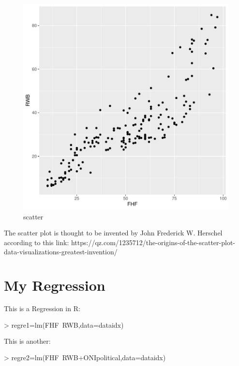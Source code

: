 \documentclass[11pt]{article}
\begin{document}
\begin{figure}[h]
\centering
\begin{adjustbox}{width=7cm,height=5.5cm}
\includegraphics{PaperInR_7-numnum_plot}
\end{adjustbox}
\caption{scatter}  
\label{numnum_plot} 
\end{figure}



The scatter plot is thought to be invented by  John Frederick W. Herschel according to this link: https://qz.com/1235712/the-origins-of-the-scatter-plot-data-visualizations-greatest-invention/

\section{My Regression}\label{regre}

This is a Regression in R:

\begin{Schunk}
\begin{Sinput}
> regre1=lm(FHF~RWB,data=dataidx)
\end{Sinput}
\end{Schunk}

This is another:

\begin{Schunk}
\begin{Sinput}
> regre2=lm(FHF~RWB+ONIpolitical,data=dataidx)
\end{Sinput}
\end{Schunk}
\end{document}

